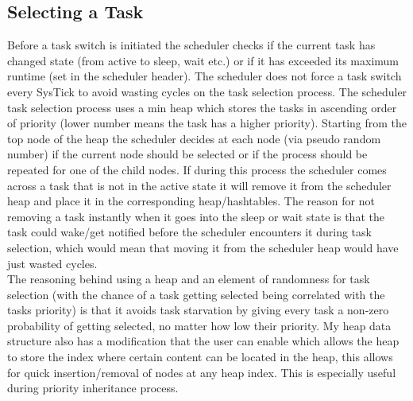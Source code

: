 \documentclass[12pt,a4paper]{article}
\begin{document}



\subsection{Selecting a Task}
Before a task switch is initiated the scheduler checks if the current task has changed state (from active to sleep, wait etc.) or if it has exceeded its maximum runtime (set in the scheduler header). The scheduler does not force a task switch every SysTick to avoid wasting cycles on the task selection process. The scheduler task selection process uses a min heap which stores the tasks in ascending order of priority (lower number means the task has a higher priority). Starting from the top node of the heap the scheduler decides at each node (via pseudo random number) if the current node should be selected or if the process should be repeated for one of the child nodes. If during this process the scheduler comes across a task that is not in the active state it will remove it from the scheduler heap and place it in the corresponding heap/hashtables. The reason for not removing a task instantly when it goes into the sleep or wait state is that the task could wake/get notified before the scheduler encounters it during task selection, which would mean that moving it from the scheduler heap would have just wasted cycles.\\

The reasoning behind using a heap and an element of randomness for task selection (with the chance of a task getting selected being correlated with the tasks priority) is that it avoids task starvation by giving every task a non-zero probability of getting selected, no matter how low their priority. My heap data structure also has a modification that the user can enable which allows the heap to store the index where certain content can be located in the heap, this allows for quick insertion/removal of nodes at any heap index. This is especially useful during priority inheritance process. 





\end{document}
